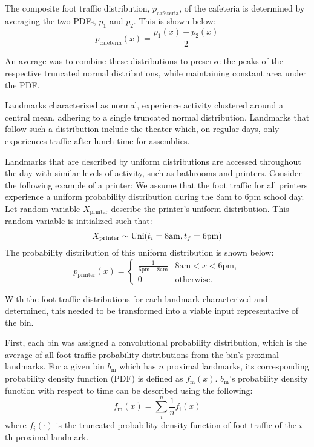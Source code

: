 \documentclass[conference]{ieeeconf}
\begin{document}
The composite foot traffic distribution, $p_\text{cafeteria}$, of the cafeteria is determined by averaging the two PDFs, $p_1$ and $p_2$. This is shown below:
\begin{equation*}
	p_\text{cafeteria}(x) = \frac{p_1(x) + p_2(x)}{2}
\end{equation*}

An average was to combine these distributions to preserve the peaks of the respective truncated normal distributions, while maintaining constant area under the PDF. 

Landmarks characterized as normal, experience activity clustered around a central mean, adhering to a single truncated normal distribution. Landmarks that follow such a distribution include the theater which, on regular days, only experiences traffic after lunch time for assemblies.

Landmarks that are described by uniform distributions are accessed throughout the day with similar levels of activity, such as bathrooms and printers. Consider the following example of a printer:
We assume that the foot traffic for all printers experience a uniform probability distribution during the 8am to 6pm school day. Let random variable $X_\text{printer}$ describe the printer's uniform distribution. This random variable is initialized such that:
\begin{equation*}
	X_\text{printer} \thicksim \text{Uni}(t_i=8\text{am}, t_f=6\text{pm})
\end{equation*}
The probability distribution of this uniform distribution is shown below:
\begin{equation*}
	p_\text{printer}(x) = \begin{cases}
						\frac{1}{6\text{pm}-8\text{am}} & 8\text{am}<x<6\text{pm}, \\
						0 & \text{otherwise}.
						  \end{cases}
\end{equation*}

With the foot traffic distributions for each landmark characterized and determined, this needed to be transformed into a viable input representative of the bin. 

First, each bin was assigned a convolutional probability distribution, which is the average of all foot-traffic probability distributions from the bin's proximal landmarks. For a given bin $b_\text{m}$ which has $n$ proximal landmarks, its corresponding probability density function (PDF) is defined as $f_\text{m}(x)$. $b_\text{m}$'s probability density function with respect to time can be described using the following:
\begin{equation*}
    f_\text{m}(x) = \sum_{i}^{n} \frac{1}{n}f_\text{i}(x)
\end{equation*}
where $f_i(\cdot)$ is the truncated probability density function of foot traffic of the $i$th proximal landmark.
\end{document}
